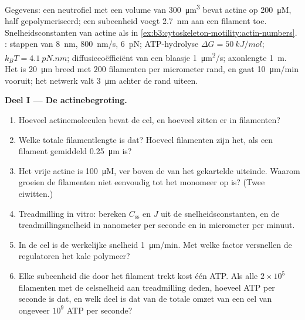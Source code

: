 \begin{problem}
\label{pb:b3:cytoskeleton-motility:1}
Gegevens: een neutrofiel met een volume van \qty{300}{\micro m^3}
bevat actine op \qty{200}{\micro M}, half gepolymeriseerd; een
subeenheid voegt \qty{2.7}{nm} aan een filament toe. Snelheidsconstanten
van actine als in
\cref{ex:b3:cytoskeleton-motility:actin-numbers}. : stappen van
\qty{8}{nm}, \qty{800}{nm/s},  \qty{6}{pN}; ATP-hydrolyse
$\Delta G = \qty{50}{kJ/mol}$; $k_{B}T = \qty{4.1}{pN.nm}$;
diffusiecoëfficiënt van een blaasje \qty{1}{\micro m^2/s}; axonlengte
\qty{1}{m}. Het  is \qty{20}{\micro m} breed met $200$
filamenten per micrometer rand, en gaat \qty{10}{\micro m/min} vooruit;
het netwerk valt \qty{3}{\micro m} achter de rand uiteen.

\medskip
\noindent\textbf{Deel I --- De actinebegroting.}
\begin{enumerate}
  \item Hoeveel actinemoleculen bevat de cel, en hoeveel zitten er in
        filamenten?
  \item Welke totale filamentlengte is dat? Hoeveel filamenten zijn
        het, als een filament gemiddeld \qty{0.25}{\micro m} is?
  \item Het vrije actine is \qty{100}{\micro M}, ver boven de  van het gekartelde uiteinde. Waarom groeien de
        filamenten niet eenvoudig tot het monomeer op is? (Twee
        eiwitten.)
  \item Treadmilling in vitro: bereken $C_{\text{ss}}$ en $J$ uit de
        snelheidsconstanten, en de treadmillingsnelheid in nanometer per
        seconde en in micrometer per minuut.
  \item In de cel is de werkelijke snelheid \qty{1}{\micro m/min}. Met
        welke factor versnellen de regulatoren het kale polymeer?
  \item Elke subeenheid die door het filament trekt kost één ATP. Als
        alle $2\times 10^{5}$ filamenten met de celsnelheid aan
        treadmilling deden, hoeveel ATP per seconde is dat, en welk deel
        is dat van de totale omzet van een cel van ongeveer $10^{9}$ ATP
        per seconde?
\end{enumerate}


\end{problem}

